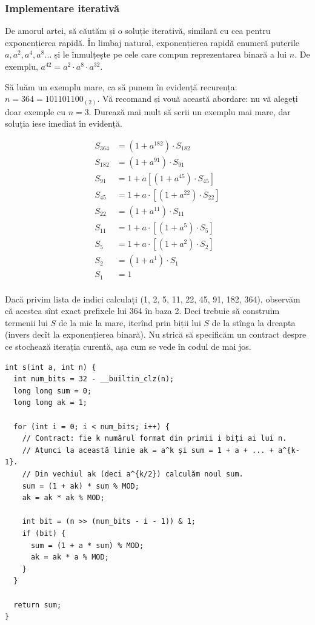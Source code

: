\documentclass[../main.tex]{subfiles}
\begin{document}
\subsubsection*{Implementare iterativă}

De amorul artei, să căutăm și o soluție iterativă, similară cu cea pentru exponențierea rapidă. În limbaj natural, exponențierea rapidă enumeră puterile $a, a^2, a^4, a^8 \dots$ și le înmulțește pe cele care compun reprezentarea binară a lui $n$. De exemplu, $a^{42} = a^2 \cdot a^8 \cdot a^{32}$.

Să luăm un exemplu mare, ca să punem în evidență recurența: $n = 364 = 101101100_{(2)}$. Vă recomand și vouă această abordare: nu vă alegeți doar exemple cu $n = 3$. Durează mai mult să scrii un exemplu mai mare, dar soluția iese imediat în evidență.

\begin{align*}
S_{364} &= (1 + a^{182}) \cdot S_{182} \\
S_{182} &= (1 + a^{91}) \cdot S_{91} \\
S_{91} &= 1 + a [(1 + a^{45}) \cdot S_{45}] \\
S_{45} &= 1 + a \cdot [(1 + a^{22}) \cdot S_{22}] \\
S_{22} &= (1 + a^{11}) \cdot S_{11} \\
S_{11} &= 1 + a \cdot [(1 + a^{5}) \cdot S_{5}] \\
S_{5} &= 1 + a \cdot [(1 + a^{2}) \cdot S_{2}] \\
S_{2} &= (1 + a^{1}) \cdot S_{1} \\
S_{1} &= 1 \\
\end{align*}

Dacă privim lista de indici calculați (1, 2, 5, 11, 22, 45, 91, 182, 364), observăm că acestea sînt exact prefixele lui 364 în baza 2. Deci trebuie să construim termenii lui $S$ de la mic la mare, iterînd prin biții lui $S$ de la stînga la dreapta (invers decît la exponențierea binară). Nu strică să specificăm un contract despre ce stochează iterația curentă, așa cum se vede în codul de mai jos.

\begin{verbatim}
int s(int a, int n) {
  int num_bits = 32 - __builtin_clz(n);
  long long sum = 0;
  long long ak = 1;

  for (int i = 0; i < num_bits; i++) {
    // Contract: fie k numărul format din primii i biți ai lui n.
    // Atunci la această linie ak = a^k și sum = 1 + a + ... + a^{k-1}.
    // Din vechiul ak (deci a^{k/2}) calculăm noul sum.
    sum = (1 + ak) * sum % MOD;
    ak = ak * ak % MOD;

    int bit = (n >> (num_bits - i - 1)) & 1;
    if (bit) {
      sum = (1 + a * sum) % MOD;
      ak = ak * a % MOD;
    }
  }

  return sum;
}
\end{verbatim}
\end{document}
